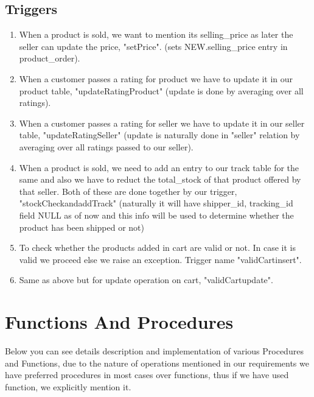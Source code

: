 \documentclass[a4paper,12pt]{article}
\begin{document}
\subsection{Triggers}
\begin{enumerate}
  \item When a product is sold, we want to mention its selling\_price as later the seller can update the price, "setPrice". (sets NEW.selling\_price entry in product\_order).
  \item When a customer passes a rating for product we have to update it in our product table, "updateRatingProduct" (update is done by averaging over all ratings).
  \item When a customer passes a rating for seller we have to update it in our seller table, "updateRatingSeller" (update is naturally done in "seller" relation by averaging over all ratings passed to our seller).
  \item When a product is sold, we need to add an entry to our track table for the same and also we have to reduct the total\_stock of that product offered by that seller. Both of these are done together by our trigger, "stockCheckandaddTrack" (naturally it will have shipper\_id, tracking\_id field NULL as of now and this info will be used to determine whether the product has been shipped or not)
  \item To check whether the products added in cart are valid or not. In case it is valid we proceed else we raise an exception. Trigger name "validCartinsert".
  \item Same as above but for update operation on cart, "validCartupdate".
\end{enumerate}
\newpage
\section{Functions And Procedures}
Below you can see details description and implementation of various Procedures and Functions, due to the nature of operations mentioned in our requirements we have preferred procedures in most cases over functions, thus if we have used function, we explicitly mention it.
\end{document}
